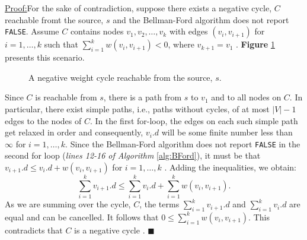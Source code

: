 \documentclass[a4paper, 12pt]{report}
\newenvironment{claimproof}[1]{\par\noindent\underline{Proof:}\space#1}{\hfill $\blacksquare$}
\theoremstyle{definition}
\begin{document}
\begin{claimproof}
For the sake of contradiction, suppose there exists a negative cycle, \(C\) reachable fromt the source, \(s\) and the Bellman-Ford algorithm does not report \texttt{FALSE}.
Assume \(C\) contains nodes \(v_{1}, v_{2}, \ldots, v_{k}\) with edges \((v_{i}, v_{i + 1})\) for \(i = 1, \ldots, k\) such that $\sum_{i=1}^{k} w(v_{i}, v_{i + 1}) < 0$, where
\(v_{k + 1} = v_{1}\) \cite{cormenBk,stand:bford:11}. \textbf{Figure} \ref{fig4:negweight} presents this scenario.

\begin{figure}[H]
    \centering
    \caption{A negative weight cycle reachable from the source, \(s\).}
    \label{fig4:negweight}
\end{figure}

Since \(C\) is reachable from \(s\), there is a path from \(s\) to \(v_{1}\) and to all nodes on \(C\). In particular, there exist simple paths, i.e., paths without cycles, of at most \(|V| - 1\)
edges to the nodes of \(C\). In the first for-loop, the edges on each such simple path get relaxed in order and consequently, \(v_{i}.d\) will be some finite number less than \(\infty\) for \(i = 1, \ldots, k\).
Since the Bellman-Ford algorithm does not report \texttt{FALSE} in the second for loop (\emph{lines 12-16 of Algorithm} \ref{alg:BFord}), it must be that
$v_{i+1}.d \leq v_{i}.d + w(v_{i}, v_{i+1})$ for $i = 1, \ldots, k$ \cite{cormenBk,stand:bford:11}. Adding the inequalities, we obtain:
\begin{equation}
    \sum_{i=1}^{k} v_{i+1}.d \leq  \sum_{i=1}^{k} v_{i}.d + \sum_{i=1}^{k} w(v_{i}, v_{i+1}) .  
\end{equation}
As we are summing over the cycle, \(C\), the terms $\sum_{i=1}^{k} v_{i+1}.d$ and $\sum_{i=1}^{k} v_{i}.d$ are equal and can be cancelled. It follows that $0 \leq \sum_{i=1}^{k} w(v_{i}, v_{i+1})$. This contradicts that \(C\)
is a negative cycle \cite{cormenBk,stand:bford:11}.
\end{claimproof}
\end{document}
